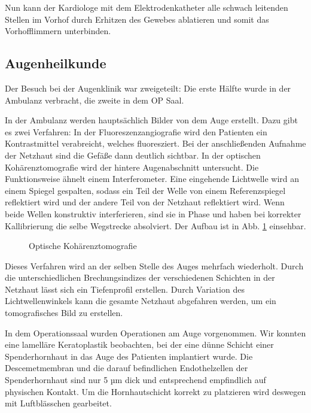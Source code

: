 \documentclass[11pt,a4paper,titlepage]{scrartcl}
\begin{document}
Nun kann der Kardiologe mit dem Elektrodenkatheter alle schwach leitenden Stellen im Vorhof durch Erhitzen des Gewebes ablatieren und somit das Vorhofflimmern unterbinden.



\subsection{Augenheilkunde}

Der Besuch bei der Augenklinik war zweigeteilt: Die erste Hälfte wurde in der Ambulanz verbracht, die zweite in dem OP Saal. \medskip

In der Ambulanz werden hauptsächlich Bilder von dem Auge erstellt.
Dazu gibt es zwei Verfahren: In der Fluoreszenzangiografie wird den Patienten ein Kontrastmittel verabreicht, welches fluoresziert.
Bei der anschließenden Aufnahme der Netzhaut sind die Gefäße dann deutlich sichtbar.
In der optischen Kohärenztomografie wird der hintere Augenabschnitt untersucht.
Die Funktionsweise ähnelt einem Interferometer.
Eine eingehende Lichtwelle wird an einem Spiegel gespalten, sodass ein Teil der Welle von einem Referenzspiegel reflektiert wird und der andere Teil von der Netzhaut reflektiert wird.
Wenn beide Wellen konstruktiv interferieren, sind sie in Phase und haben bei korrekter Kallibrierung die selbe Wegstrecke absolviert.
Der Aufbau ist in Abb. \ref{fig:kohärenz} einsehbar.

\begin{figure}%
    \centering
    \qquad
    \caption{Optische Kohärenztomografie}%
    \label{fig:kohärenz}%
\end{figure}

Dieses Verfahren wird an der selben Stelle des Auges mehrfach wiederholt.
Durch die unterschiedlichen Brechungsindizes der verschiedenen Schichten in der Netzhaut lässt sich ein Tiefenprofil erstellen.
Durch Variation des Lichtwellenwinkels kann die gesamte Netzhaut abgefahren werden, um ein tomografisches Bild zu erstellen. \medskip

In dem Operationssaal wurden Operationen am Auge vorgenommen.
Wir konnten eine lamelläre Keratoplastik beobachten, bei der eine dünne Schicht einer Spenderhornhaut in das Auge des Patienten implantiert wurde.
Die Descemetmembran und die darauf befindlichen Endothelzellen der Spenderhornhaut sind nur 5 µm dick und entsprechend empfindlich auf physischen Kontakt.
Um die Hornhautschicht korrekt zu platzieren wird deswegen mit Luftblässchen gearbeitet.
\end{document}
